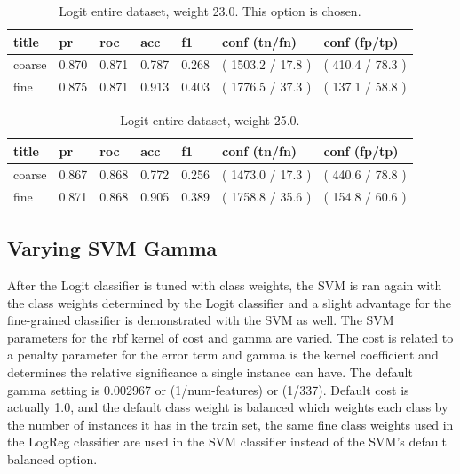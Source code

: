 \documentclass[ms]{nuthesis}
\begin{document}
\FloatBarrier
\begin{table}[H]
\centering
\caption{Logit entire dataset, weight 23.0. This option is chosen.}
\label{tab:LogRegAll-Wt23}
\begin{tabular}{|l||l||l||l||l||l||l|}\toprule
title & pr & roc & acc & f1 & conf (tn/fn) & conf (fp/tp) \\ \midrule
coarse & 0.870 & 0.871 & 0.787 & 0.268 & ( 1503.2 / 17.8 ) & ( 410.4 / 78.3 ) \\
fine & 0.875 & 0.871 & 0.913 & 0.403 & ( 1776.5 / 37.3 ) & ( 137.1 / 58.8 ) \\ \bottomrule
\end{tabular}
\end{table}
\FloatBarrier

\FloatBarrier
\begin{table}[H]
\centering
\caption{Logit entire dataset, weight 25.0.}
\label{tab:LogRegAll-Wt25}
\begin{tabular}{|l||l||l||l||l||l||l|}\toprule
title & pr & roc & acc & f1 & conf (tn/fn) & conf (fp/tp) \\ \midrule
coarse & 0.867 & 0.868 & 0.772 & 0.256 & ( 1473.0 / 17.3 ) & ( 440.6 / 78.8 ) \\
fine & 0.871 & 0.868 & 0.905 & 0.389 & ( 1758.8 / 35.6 ) & ( 154.8 / 60.6 ) \\ \bottomrule
\end{tabular}
\end{table}
\FloatBarrier


\subsection{Varying SVM Gamma}
\par After the Logit classifier is tuned with class weights, the SVM is ran again with the
class weights determined by the Logit classifier and a slight advantage for the fine-grained
classifier is demonstrated with the SVM as well. The SVM parameters for the rbf
kernel of cost and gamma are varied. The cost is related to a penalty parameter for the error term
and gamma is the kernel coefficient and determines the relative significance a single instance can have.
The default gamma setting is 0.002967 or (1/num-features) or (1/337). Default
 cost is actually 1.0, and the default class weight is balanced which weights each class by
 the number of instances it has in the train set, the same fine class weights used in the LogReg
 classifier are used in the SVM classifier instead of the SVM's default balanced option.
\end{document}
